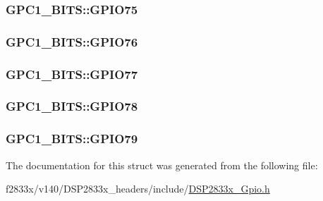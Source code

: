 \subsubsection[{G\+P\+I\+O75}]{ G\+P\+C1\+\_\+\+B\+I\+T\+S\+::\+G\+P\+I\+O75}\label{struct_g_p_c1___b_i_t_s_af6339ad4d7800f1024220ce50bc67326}
\hypertarget{struct_g_p_c1___b_i_t_s_a9061fdfa155cac8a0dfe0b2145528a63}{}
\subsubsection[{G\+P\+I\+O76}]{ G\+P\+C1\+\_\+\+B\+I\+T\+S\+::\+G\+P\+I\+O76}\label{struct_g_p_c1___b_i_t_s_a9061fdfa155cac8a0dfe0b2145528a63}
\hypertarget{struct_g_p_c1___b_i_t_s_a4066ca864828d9e25485dee909ad450f}{}
\subsubsection[{G\+P\+I\+O77}]{ G\+P\+C1\+\_\+\+B\+I\+T\+S\+::\+G\+P\+I\+O77}\label{struct_g_p_c1___b_i_t_s_a4066ca864828d9e25485dee909ad450f}
\hypertarget{struct_g_p_c1___b_i_t_s_ad92d75291f8f9451fb33b31bdb80e97d}{}
\subsubsection[{G\+P\+I\+O78}]{ G\+P\+C1\+\_\+\+B\+I\+T\+S\+::\+G\+P\+I\+O78}\label{struct_g_p_c1___b_i_t_s_ad92d75291f8f9451fb33b31bdb80e97d}
\hypertarget{struct_g_p_c1___b_i_t_s_af55d6bbd3208945e61e2ba2ee58eb81b}{}
\subsubsection[{G\+P\+I\+O79}]{ G\+P\+C1\+\_\+\+B\+I\+T\+S\+::\+G\+P\+I\+O79}\label{struct_g_p_c1___b_i_t_s_af55d6bbd3208945e61e2ba2ee58eb81b}


The documentation for this struct was generated from the following file\+:\begin{DoxyCompactItemize}
\item 
f2833x/v140/\+D\+S\+P2833x\+\_\+headers/include/\hyperlink{_d_s_p2833x___gpio_8h}{D\+S\+P2833x\+\_\+\+Gpio.\+h}\end{DoxyCompactItemize}
